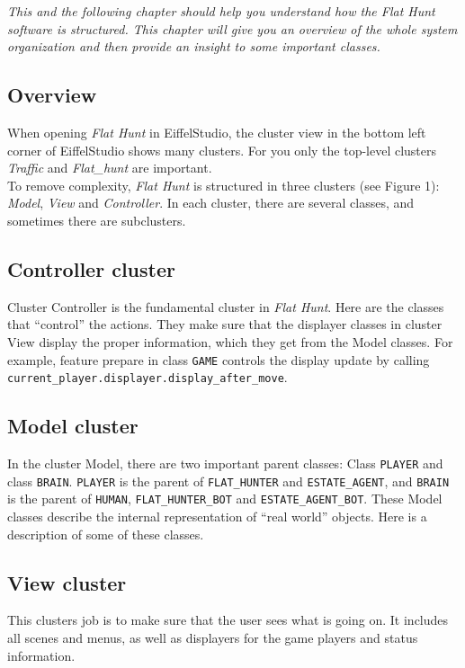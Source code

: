 \emph{This and the following chapter should help you understand how the Flat Hunt software is structured. This chapter will give you an overview of the whole system organization and then provide an insight to some important classes.}

\subsection{Overview}

When opening \emph{Flat Hunt} in EiffelStudio, the cluster view in the bottom left corner of EiffelStudio shows many clusters. For you only the top-level clusters \emph{Traffic} and \emph{Flat\_hunt} are important.\\

To remove complexity, \emph{Flat Hunt} is structured in three clusters (see Figure 1): \emph{Model}, \emph{View} and \emph{Controller}. In each cluster, there are several classes, and sometimes there are subclusters.\\

\subsection{Controller cluster}

Cluster Controller is the fundamental cluster in \emph{Flat Hunt}. Here are the classes that ``control'' the actions. They make sure that the displayer classes in cluster View display the proper information, which they get from the Model classes. For example, feature prepare in class \texttt{GAME} controls the display update by calling \texttt{current\_player.displayer.display\_after\_move}.

\subsection{Model cluster}
In the cluster Model, there are two important parent classes: Class \texttt{PLAYER} and class \texttt{BRAIN}. \texttt{PLAYER} is the parent of \texttt{FLAT\_HUNTER} and \texttt{ESTATE\_AGENT}, and \texttt{BRAIN} is the parent of \texttt{HUMAN}, \texttt{FLAT\_HUNTER\_BOT} and \texttt{ESTATE\_AGENT\_BOT}. These Model classes describe the internal representation of ``real world'' objects. Here is a description of some of these classes.

\subsection{View cluster}
 This clusters job is to make sure that the user sees what is going on. It includes all scenes and menus, as well as displayers for the game players and status information.
